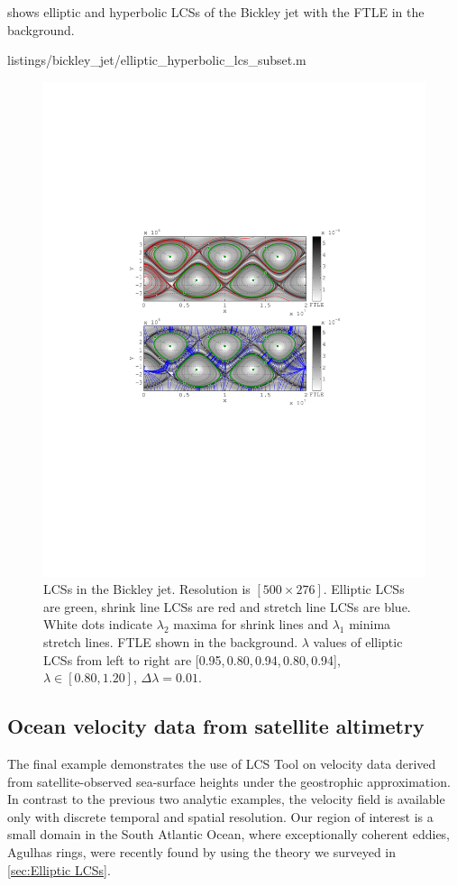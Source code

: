 \documentclass[5p]{elsarticle}
\begin{document}
 shows elliptic and hyperbolic LCSs of the Bickley jet with the FTLE in the background.


        {listings/bickley_jet/elliptic_hyperbolic_lcs_subset.m}

\begin{figure}
\centering
\includegraphics[width=.475\textwidth]{graphics/bickley_jet/lambda_hyperbolic_lcs}
\caption{
LCSs in the Bickley jet.
Resolution is $[500 \times 276]$.
Elliptic LCSs are green, shrink line LCSs are red and stretch line LCSs are blue.
White dots indicate $\lambda_2$ maxima for shrink lines and $\lambda_1$ minima stretch lines.
FTLE shown in the background.
$\lambda$ values of elliptic LCSs from left to right are [0.95,\,0.80,\,0.94,\,0.80,\,0.94], $\lambda \in [0.80,1.20]$, $\Delta\lambda = 0.01$.
}
\label{f:Bickley jet LCS}
\end{figure}

\subsection{Ocean velocity data from satellite altimetry}
\label{sec:oceandataset}

The final example demonstrates the use of LCS Tool on velocity data derived from satellite-observed sea-surface heights under the geostrophic approximation. In contrast to the previous two analytic examples, the velocity field is available only with discrete temporal and spatial resolution. Our region of interest is a small domain in the South Atlantic Ocean, where exceptionally coherent eddies, Agulhas rings, were recently found by \citet{haller13:_coher_lagran,haller14:_adden_coher_lagran} using the theory we surveyed in \cref{sec:Elliptic LCSs}.
\end{document}
